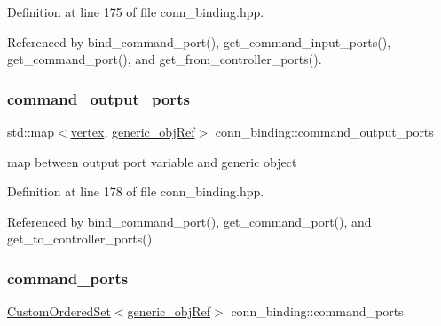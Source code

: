 Definition at line 175 of file conn\+\_\+binding.\+hpp.



Referenced by bind\+\_\+command\+\_\+port(), get\+\_\+command\+\_\+input\+\_\+ports(), get\+\_\+command\+\_\+port(), and get\+\_\+from\+\_\+controller\+\_\+ports().

\mbox{\label{classconn__binding_ad312dee69a14b9c6598f5af99308a87a}} 
\subsubsection{\texorpdfstring{command\+\_\+output\+\_\+ports}{command\_output\_ports}}
{\footnotesize\ttfamily std\+::map$<$\hyperlink{graph_8hpp_abefdcf0544e601805af44eca032cca14}{vertex}, \hyperlink{generic__obj_8hpp_acb533b2ef8e0fe72e09a04d20904ca81}{generic\+\_\+obj\+Ref}$>$ conn\+\_\+binding\+::command\+\_\+output\+\_\+ports\hspace{0.3cm}{\ttfamily [protected]}}



map between output port variable and generic object 



Definition at line 178 of file conn\+\_\+binding.\+hpp.



Referenced by bind\+\_\+command\+\_\+port(), get\+\_\+command\+\_\+port(), and get\+\_\+to\+\_\+controller\+\_\+ports().

\mbox{\label{classconn__binding_a87dd4f0563999fbb03571769db2372ba}} 
\subsubsection{\texorpdfstring{command\+\_\+ports}{command\_ports}}
{\footnotesize\ttfamily \hyperlink{classCustomOrderedSet}{Custom\+Ordered\+Set}$<$\hyperlink{generic__obj_8hpp_acb533b2ef8e0fe72e09a04d20904ca81}{generic\+\_\+obj\+Ref}$>$ conn\+\_\+binding\+::command\+\_\+ports\hspace{0.3cm}{\ttfamily [protected]}}



